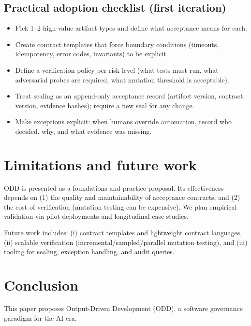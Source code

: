 \documentclass[conference]{IEEEtran}
\begin{document}
\subsection{Practical adoption checklist (first iteration)}
\begin{itemize}
\item Pick 1--2 high-value artifact types and define what acceptance means for each.
\item Create contract templates that force boundary conditions (timeouts, idempotency, error codes, invariants) to be explicit.
\item Define a verification policy per risk level (what tests must run, what adversarial probes are required, what mutation threshold is acceptable).
\item Treat sealing as an append-only acceptance record (artifact version, contract version, evidence hashes); require a new seal for any change.
\item Make exceptions explicit: when humans override automation, record who decided, why, and what evidence was missing.
\end{itemize}

\section{Limitations and future work}\label{sec:limitations}
ODD is presented as a foundations-and-practice proposal. Its effectiveness depends on (1) the quality and maintainability of acceptance contracts, and (2) the cost of verification (mutation testing can be expensive). We plan empirical validation via pilot deployments and longitudinal case studies.

Future work includes: (i) contract templates and lightweight contract languages, (ii) scalable verification (incremental/sampled/parallel mutation testing), and (iii) tooling for sealing, exception handling, and audit queries.

\section{Conclusion}
This paper proposes Output-Driven Development (ODD), a software governance paradigm for the AI era.
\end{document}
